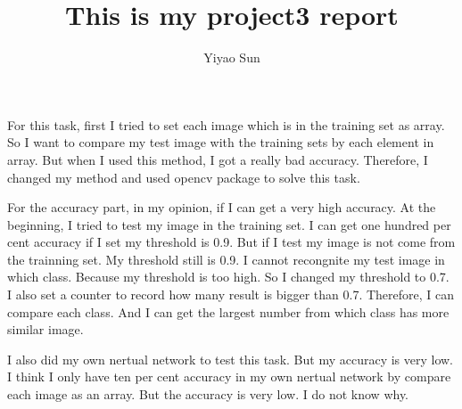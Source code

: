 \documentclass[12pt]{report}
\begin{document}
\author{Yiyao Sun}
\title{This is my project3 report}
\maketitle
\LARGE

For this task, first I tried to set each image which is in the training set as array. So I want to compare my test image with the training sets by each element in array. But when I used this method, I got a really bad accuracy. Therefore, I changed my method and used opencv package to solve this task. 
\begin{center}
	
\end{center}
For the accuracy part,
in my opinion, if I can get a very high accuracy. At the beginning, I tried 
to test my image in the training set. I can get one hundred per cent accuracy if I set my threshold is 0.9. But if I test my image is not come from the trainning set. My threshold still is 0.9. I cannot recongnite my test image in which class. Because my threshold is too high. So I changed my threshold to 0.7. I also set a counter to record how many result is bigger than 0.7. Therefore, I can compare each class. And I can get the largest number from which class has more similar image.

I also did my own nertual network to test this task. But my accuracy is very low. I think I only have ten per cent accuracy in my own nertual network by compare each image as an array. But the accuracy is very low. I do not know why.  
\end{document}
